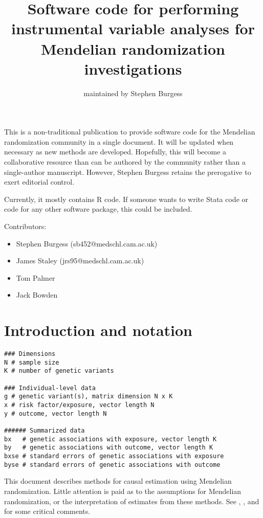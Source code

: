 \documentclass[a4paper,12pt]{article} %
\begin{document}
\title{Software code for performing instrumental variable analyses for Mendelian randomization investigations}
\author{maintained by Stephen Burgess}
\maketitle
This is a non-traditional publication to provide software code for the Mendelian randomization community in a single document. It will be updated when necessary as new methods are developed. Hopefully, this will become a collaborative resource than can be authored by the community rather than a single-author manuscript. However, Stephen Burgess retains the prerogative to exert editorial control.

Currently, it mostly contains R code. If someone wants to write Stata code or code for any other software package, this could be included.

Contributors:
\begin{itemize}
\item Stephen Burgess (sb452@medschl.cam.ac.uk)
\item James Staley (jrs95@medschl.cam.ac.uk)
\item Tom Palmer
\item Jack Bowden
\end{itemize}

\clearpage

\tableofcontents %

\clearpage

\section{Introduction and notation}
\begin{lstlisting}
### Dimensions
N # sample size
K # number of genetic variants

### Individual-level data
g # genetic variant(s), matrix dimension N x K
x # risk factor/exposure, vector length N
y # outcome, vector length N

###### Summarized data
bx   # genetic associations with exposure, vector length K
by   # genetic associations with outcome, vector length K
bxse # standard errors of genetic associations with exposure
byse # standard errors of genetic associations with outcome
\end{lstlisting}

This document describes methods for causal estimation using Mendelian randomization. Little attention is paid as to the assumptions for Mendelian randomization, or the interpretation of estimates from these methods. See \cite{hernan2006}, \cite{glymour2012}, \cite{vanderweele2014} and \cite{burgess2015beyond} for some critical comments.
\end{document}
